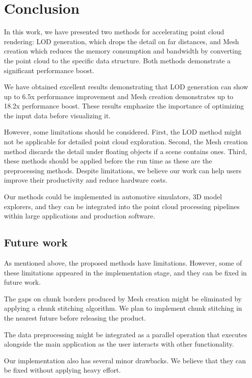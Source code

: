\chapter{Conclusion}
\label{chap:conclusion}

In this work, we have presented two methods for accelerating point cloud rendering: LOD generation, which drops the detail on far distances, and Mesh creation which reduces the memory consumption and bandwidth by converting the point cloud to the specific data structure. Both methods demonstrate a significant performance boost.

We have obtained excellent results demonstrating that LOD generation can show up to 6.5x performance improvement and Mesh creation demonstrates up to 18.2x performance boost. These results emphasize the importance of optimizing the input data before visualizing it.

However, some limitations should be considered. First, the LOD method might not be applicable for detailed point cloud exploration. Second, the Mesh creation method discards the detail under floating objects if a scene contains ones. Third, these methods should be applied before the run time as these are the preprocessing methods. Despite limitations, we believe our work can help users improve their productivity and reduce hardware costs.

Our methods could be implemented in automotive simulators, 3D model explorers, and they can be integrated into the point cloud processing pipelines within large applications and production software.

\section{Future work}

As mentioned above, the proposed methods have limitations. However, some of these limitations appeared in the implementation stage, and they can be fixed in future work.

The gaps on chunk borders produced by Mesh creation might be eliminated by applying a chunk stitching algorithm. We plan to implement chunk stitching in the nearest future before releasing the product.

The data preprocessing might be integrated as a parallel operation that executes alongside the main application as the user interacts with other functionality.

Our implementation also has several minor drawbacks. We believe that they can be fixed without applying heavy effort. 

